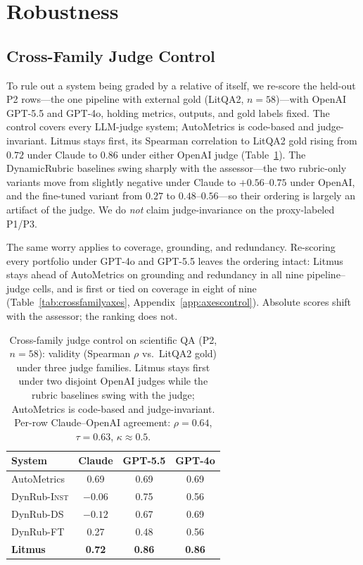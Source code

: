 \documentclass[11pt]{article}
\begin{document}
\section{Robustness}
\label{sec:robustness}

\subsection{Cross-Family Judge Control}
\label{sec:crossfamily}
To rule out a system being graded by a relative of itself, we re-score the held-out P2 rows---the one pipeline with external gold (LitQA2, $n{=}58$)---with OpenAI GPT-5.5 and GPT-4o, holding metrics, outputs, and gold labels fixed. The control covers every LLM-judge system; AutoMetrics is code-based and judge-invariant. Litmus stays first, its Spearman correlation to LitQA2 gold rising from $0.72$ under Claude to $0.86$ under either OpenAI judge (Table~\ref{tab:crossfamily}). The DynamicRubric baselines swing sharply with the assessor---the two rubric-only variants move from slightly negative under Claude to $+0.56$--$0.75$ under OpenAI, and the fine-tuned variant from $0.27$ to $0.48$--$0.56$---so their ordering is largely an artifact of the judge. We do \emph{not} claim judge-invariance on the proxy-labeled P1/P3.

The same worry applies to coverage, grounding, and redundancy. Re-scoring every portfolio under GPT-4o and GPT-5.5 leaves the ordering intact: Litmus stays ahead of AutoMetrics on grounding and redundancy in all nine pipeline--judge cells, and is first or tied on coverage in eight of nine (Table~\ref{tab:crossfamilyaxes}, Appendix~\ref{app:axescontrol}). Absolute scores shift with the assessor; the ranking does not.

\begin{table}[t]
\centering
\small
\setlength{\tabcolsep}{5pt}
\begin{tabular}{lccc}
\toprule
System & Claude & GPT-5.5 & GPT-4o \\
\midrule
AutoMetrics & 0.69 & 0.69 & 0.69 \\
DynRub-\textsc{Inst} & $-0.06$ & 0.75 & 0.56 \\
DynRub-\textsc{DS} & $-0.12$ & 0.67 & 0.69 \\
DynRub-\textsc{FT} & 0.27 & 0.48 & 0.56 \\
\textbf{Litmus} & \textbf{0.72} & \textbf{0.86} & \textbf{0.86} \\
\bottomrule
\end{tabular}
\caption{Cross-family judge control on scientific QA (P2, $n{=}58$): validity (Spearman $\rho$ vs.\ LitQA2 gold) under three judge families. Litmus stays first under two disjoint OpenAI judges while the rubric baselines swing with the judge; AutoMetrics is code-based and judge-invariant. Per-row Claude--OpenAI agreement: $\rho=0.64$, $\tau=0.63$, $\kappa\approx0.5$.}
\label{tab:crossfamily}
\end{table}
\end{document}

